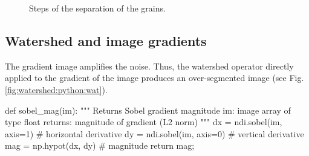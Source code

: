 \begin{figure}[H]
 \centering\caption{Steps of the separation of the grains.}%
 \hfill
 \hfill
 \label{fig:watershed:python:dm}%
 \vspace*{-10pt}%
\end{figure}

\vspace*{-15pt}

\subsection{Watershed and image gradients}
The gradient image amplifies the noise. Thus, the watershed operator directly applied to the gradient of the image produces an over-segmented image (see Fig.\ref{fig:watershed:python:wat}).

\begin{python}
def sobel_mag(im):
    """
    Returns Sobel gradient magnitude
    im: image array of type float
    returns: magnitude of gradient (L2 norm)
    """
    dx = ndi.sobel(im, axis=1)   # horizontal derivative
    dy = ndi.sobel(im, axis=0)   # vertical derivative
    mag = np.hypot(dx, dy)  # magnitude
    return mag;
\end{python}

